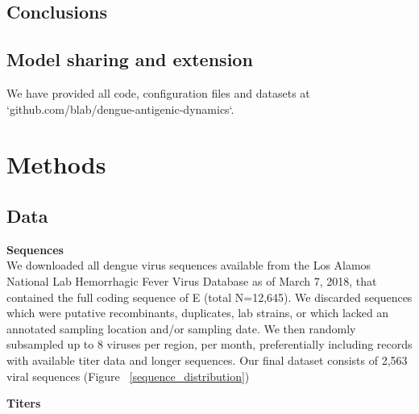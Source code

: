 \documentclass[11pt,oneside,letterpaper]{article}
\begin{document}
\subsection*{Conclusions}



\subsection*{Model sharing and extension}
We have provided all code, configuration files and datasets at `github.com/blab/dengue-antigenic-dynamics`.

\newpage

\section*{Methods}
\subsection*{Data}
\textbf{Sequences}\\
We downloaded all dengue virus sequences available from the Los Alamos National Lab Hemorrhagic Fever Virus Database as of March 7, 2018, that contained the full coding sequence of E (total N=12,645).
We discarded sequences which were putative recombinants, duplicates, lab strains, or which lacked an annotated sampling location and/or sampling date.
We then randomly subsampled up to 8 viruses per region, per month, preferentially including records with available titer data and longer sequences.
Our final dataset consists of 2,563 viral sequences (Figure ~\ref{sequence_distribution})

\textbf{Titers}\\
\end{document}
